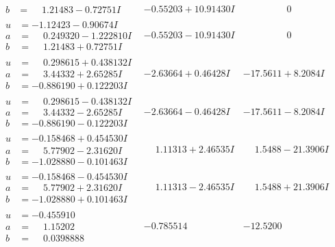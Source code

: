 \documentclass[1p]{elsarticle_modified}
\theoremstyle{definition}
\begin{document}
$$\begin{array}{c|c|c}
\begin{aligned}
b &= \phantom{-}1.21483 - 0.72751 I\end{aligned}
 & -0.55203 + 10.91430 I & \phantom{-0.000000 } 0 \\ \hline\begin{aligned}
u &= -1.12423 - 0.90674 I \\
a &= \phantom{-}0.249320 - 1.222810 I \\
b &= \phantom{-}1.21483 + 0.72751 I\end{aligned}
 & -0.55203 - 10.91430 I & \phantom{-0.000000 } 0 \\ \hline\begin{aligned}
u &= \phantom{-}0.298615 + 0.438132 I \\
a &= \phantom{-}3.44332 + 2.65285 I \\
b &= -0.886190 + 0.122203 I\end{aligned}
 & -2.63664 + 0.46428 I & -17.5611 + 8.2084 I \\ \hline\begin{aligned}
u &= \phantom{-}0.298615 - 0.438132 I \\
a &= \phantom{-}3.44332 - 2.65285 I \\
b &= -0.886190 - 0.122203 I\end{aligned}
 & -2.63664 - 0.46428 I & -17.5611 - 8.2084 I \\ \hline\begin{aligned}
u &= -0.158468 + 0.454530 I \\
a &= \phantom{-}5.77902 - 2.31620 I \\
b &= -1.028880 - 0.101463 I\end{aligned}
 & \phantom{-}1.11313 + 2.46535 I & \phantom{-}1.5488 - 21.3906 I \\ \hline\begin{aligned}
u &= -0.158468 - 0.454530 I \\
a &= \phantom{-}5.77902 + 2.31620 I \\
b &= -1.028880 + 0.101463 I\end{aligned}
 & \phantom{-}1.11313 - 2.46535 I & \phantom{-}1.5488 + 21.3906 I \\ \hline\begin{aligned}
u &= -0.455910\phantom{ +0.000000I} \\
a &= \phantom{-}1.15202\phantom{ +0.000000I} \\
b &= \phantom{-}0.0398888\phantom{ +0.000000I}\end{aligned}
 & -0.785514\phantom{ +0.000000I} & -12.5200\phantom{ +0.000000I}\\

\end{array}$$
\end{document}
